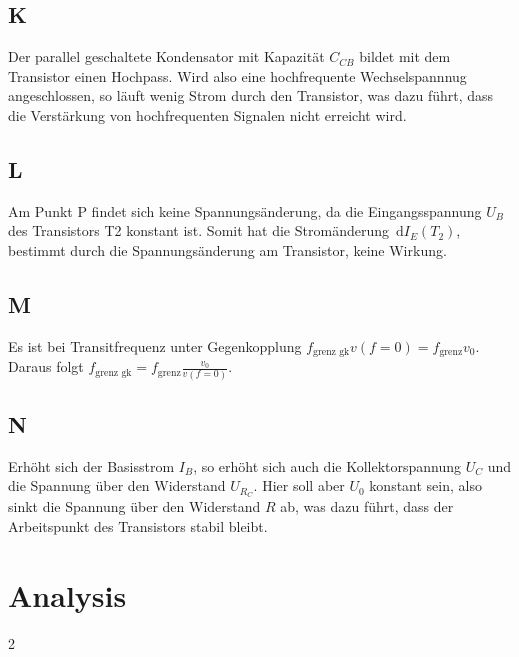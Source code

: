 \documentclass[a4paper,10pt]{article}
\newcommand{\td}{\,\text{d}}
\numberwithin{equation}{section}
\begin{document}
\begin{multicols}{2}
        \subsection{K}
        Der parallel geschaltete Kondensator mit Kapazität $C_{CB}$ bildet mit dem Transistor einen Hochpass.
        Wird also eine hochfrequente Wechselspannnug angeschlossen, so läuft wenig Strom durch den Transistor, was dazu führt, dass die Verstärkung von hochfrequenten Signalen nicht erreicht wird.

        \subsection{L}
        Am Punkt P findet sich keine Spannungsänderung, da die Eingangsspannung $U_B$ des Transistors T2 konstant ist.
        Somit hat die Stromänderung $\td I_E\left(T_2\right)$, bestimmt durch die Spannungsänderung am Transistor, keine Wirkung.

        \subsection{M}
        Es ist bei Transitfrequenz unter Gegenkopplung $f_\text{grenz gk}v\left(f=0\right)=f_\text{grenz}v_0$.
        Daraus folgt $f_\text{grenz gk}=f_\text{grenz}\tfrac{v_0}{v\left(f=0\right)}$.

        \subsection{N}
        Erhöht sich der Basisstrom $I_B$, so erhöht sich auch die Kollektorspannung $U_C$ und die Spannung über den Widerstand $U_{R_C}$.
        Hier soll aber $U_0$ konstant sein, also sinkt die Spannung über den Widerstand $R$ ab, was dazu führt, dass der Arbeitspunkt des Transistors stabil bleibt.

        \clearpage
        \section{Analysis}

\end{multicols}{2}

\clearpage
\listoffigures
\listoftables



\end{document}
